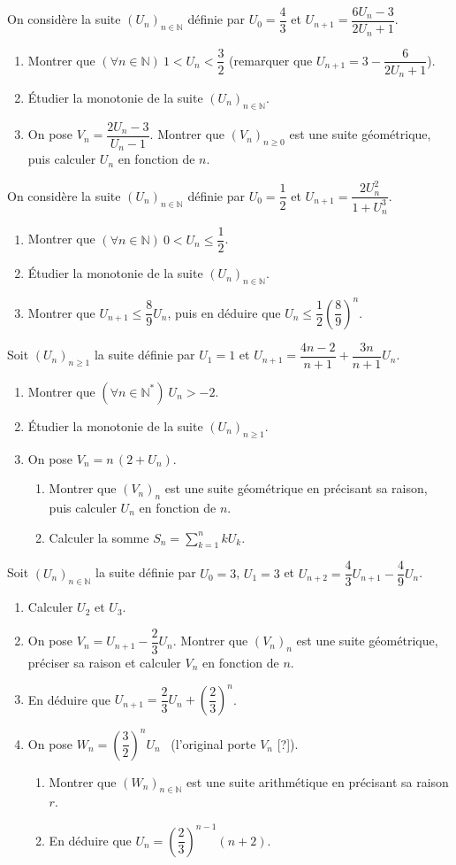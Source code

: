 On considère la suite $(U_n)_{n\in\mathbb{N}}$ définie par $U_0=\dfrac43$ et $U_{n+1}=\dfrac{6U_n-3}{2U_n+1}$.
\begin{enumerate}
\item Montrer que $(\forall n\in\mathbb{N})\ 1<U_n<\dfrac32$ \quad (remarquer que $U_{n+1}=3-\dfrac{6}{2U_n+1}$).
\item Étudier la monotonie de la suite $(U_n)_{n\in\mathbb{N}}$.
\item On pose $V_n=\dfrac{2U_n-3}{U_n-1}$. Montrer que $(V_n)_{n\geq0}$ est une suite géométrique, puis calculer $U_n$ en fonction de $n$.
\end{enumerate}
\fin
{}
On considère la suite $(U_n)_{n\in\mathbb{N}}$ définie par $U_0=\dfrac12$ et $U_{n+1}=\dfrac{2U_n^2}{1+U_n^3}$.
\begin{enumerate}
\item Montrer que $(\forall n\in\mathbb{N})\ 0<U_n\leq\dfrac12$.
\item Étudier la monotonie de la suite $(U_n)_{n\in\mathbb{N}}$.
\item Montrer que $U_{n+1}\leq\dfrac89U_n$, puis en déduire que $U_n\leq\dfrac12\left(\dfrac89\right)^n$.
\end{enumerate}
\fin
{}
Soit $(U_n)_{n\geq1}$ la suite définie par $U_1=1$ et $U_{n+1}=\dfrac{4n-2}{n+1}+\dfrac{3n}{n+1}U_n$.
\begin{enumerate}
\item Montrer que $(\forall n\in\mathbb{N}^*)\ U_n>-2$.
\item Étudier la monotonie de la suite $(U_n)_{n\geq1}$.
\item On pose $V_n=n\,(2+U_n)$.
\begin{enumerate}
\item Montrer que $(V_n)_n$ est une suite géométrique en précisant sa raison, puis calculer $U_n$ en fonction de $n$.
\item Calculer la somme $S_n=\displaystyle\sum_{k=1}^{n}kU_k$.
\end{enumerate}
\end{enumerate}
\fin
{}
Soit $(U_n)_{n\in\mathbb{N}}$ la suite définie par $U_0=3$, $U_1=3$ et $U_{n+2}=\dfrac43U_{n+1}-\dfrac49U_n$.
\begin{enumerate}
\item Calculer $U_2$ et $U_3$.
\item On pose $V_n=U_{n+1}-\dfrac23U_n$. Montrer que $(V_n)_n$ est une suite géométrique, préciser sa raison et calculer $V_n$ en fonction de $n$.
\item En déduire que $U_{n+1}=\dfrac23U_n+\left(\dfrac23\right)^n$.
\item On pose $W_n=\left(\dfrac32\right)^nU_n$ \ (l'original porte $V_n$ [?]).
\begin{enumerate}
\item Montrer que $(W_n)_{n\in\mathbb{N}}$ est une suite arithmétique en précisant sa raison $r$.
\item En déduire que $U_n=\left(\dfrac23\right)^{n-1}(n+2)$.
\end{enumerate}
\end{enumerate}
